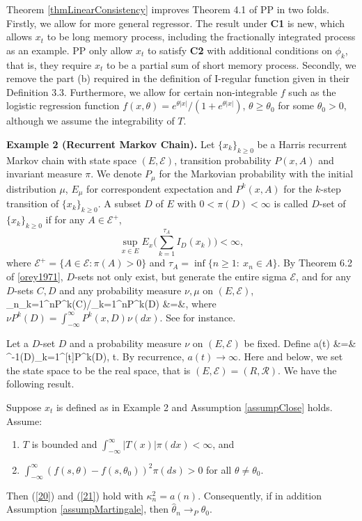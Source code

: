 Theorem \ref{thmLinearConsistency} improves Theorem 4.1 of PP in two folds. Firstly, we allow for more general regressor. The result under {\bf C1} is new, which allows $x_t$ to be long memory process, including the fractionally integrated process as an example. PP only allow $x_t$ to satisfy {\bf C2} with additional conditions on $\phi_k$, that is, they require $x_t$ to be a partial sum of short memory process. Secondly, we remove the part (b) required in the definition of I-regular function given in their Definition 3.3. Furthermore,  we allow for certain  non-integrable $f$  such as the logistic regression function $f(x, \theta)=e^{\theta |x|}/(1+e^{\theta |x|})$, $ \theta\ge \theta_0$ for some $\theta_0>0$, although we assume the integrability of  $T$.

\medskip \noindent
{\bf Example 2  (Recurrent Markov Chain).}
Let $\{x_k\}_{k\ge 0}$ be a Harris recurrent Markov chain with state space $(E, \mathcal{E})$,
transition probability $P(x, A)$ and invariant measure $\pi$. We denote $P_\mu$ for the Markovian probability
with the initial distribution $\mu$, $E_\mu$ for correspondent expectation and $P^k(x, A)$
for the $k$-step transition of $\{x_k\}_{k\ge 0}$.  A subset $D$ of $E$ with $0<\pi(D)<\infty$ is called $D$-set of $\{x_k\}_{k\ge 0}$ if for any $A\in \mathcal{E}^+$,
$$
\sup_{x\in E} E_x\big(\sum_{k=1}^{\tau_A}I_D(x_k)\big)<\infty,
$$
where $ \mathcal{E}^+=\{A\in  \mathcal{E}: \pi(A)>0\}$ and $\tau_A=\inf\{n\ge 1: \ x_n\in A\}$. By Theorem 6.2 of \ref{orey1971},
$D$-sets not only exist,  but generate the entire sigma $\mathcal{E}$, and
 for any $D$-sets $C, D$ and any probability measure $\nu, \mu$ on $(E, \mathcal{E})$,
\be
\lim_{n\to\infty}\sum_{k=1}^n\nu P^k(C)/\sum_{k=1}^n\mu P^k(D) &=&, 
\ee
where $\nu P^k(D) =\int_{-\infty}^{\infty} P^k(x, D)\nu(dx)$. See \cite{nummelin2004} for instance.

Let a $D$-set $D$ and a probability measure $\nu$ on $(E, \mathcal{E})$ be fixed. Define
\bestar
a(t) &=& \pi^{-1}(D)\sum_{k=1}^{[t]}\nu P^k(D), \quad t.
\eestar
 By recurrence, $a(t)\to\infty$. Here and below, we set the state space to be the real space, that is $(E, \mathcal{E}) = (R, \mathcal{R})$. We have the following result.

\begin{thm}  Suppose $x_t$ is defined as in Example 2 and Assumption \ref{assumpClose} holds. Assume:
\begin{enumerate}[label=(\roman{*}), leftmargin=*] \itemsep0pt \parskip0pt 
\item $T$ is bounded and $\int_{-\infty}^{\infty} |T(x)|\pi(dx) < \infty$, and
\item $\int_{-\infty}^{\infty} (f(s, \theta) - f(s, \theta_0))^2 \pi(ds)>0$ for all $\theta\not=\theta_0$.
\end{enumerate}
Then (\ref {20}) and (\ref {21}) hold with $\kappa^2_n=a(n)$.  Consequently,
if in addition  Assumption \ref{assumpMartingale}, then $\hat{\theta}_n \rightarrow_P \theta_0$.

\end{thm}

